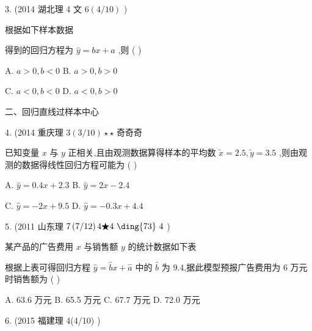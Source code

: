 \documentclass[10pt]{article}
\begin{document}
3. (2014 湖北理 4 文 \(6\left( {4/{10}}\right)\)           )

根据如下样本数据

\begin{center}
\end{center}

得到的回归方程为 \(\widehat{y} = {bx} + a\) ,则 ( )

A. \(a > 0,b < 0\) B. \(a > 0,b > 0\)

C. \(a < 0,b < 0\) D. \(a < 0,b > 0\)

二、回归直线过样本中心

4. (2014 重庆理 \(3\left( {3/{10}}\right)  \star   \star\) 奇奇奇

已知变量 \(x\) 与 \(y\) 正相关,且由观测数据算得样本的平均数 \(\widetilde{x} = {2.5},\widetilde{y} = {3.5}\) ,则由观测的数据得线性回归方程可能为 ( )

A. \(\widehat{y} = {0.4x} + {2.3}\) B. \(\widehat{y} = {2x} - {2.4}\)

C. \(\widehat{y} =  - {2x} + {9.5}\) D. \(\widehat{y} =  - {0.3x} + {4.4}\)

5. (2011 山东理 \(7\left( {7/{12}}\right) 4\bigstar 4\text{  \ding{73}  }4\) )

某产品的广告费用 \(x\) 与销售额 \(y\) 的统计数据如下表

\begin{center}
\end{center}

根据上表可得回归方程 \(\widehat{y} = \widehat{b}x + \widehat{a}\) 中的 \(\widehat{b}\) 为 9.4,据此模型预报广告费用为 6 万元时销售额为 ( )

A. 63.6 万元 B. 65.5 万元 C. 67.7 万元 D. 72.0 万元

6. (2015 福建理 4(4/10)          )
\end{document}
